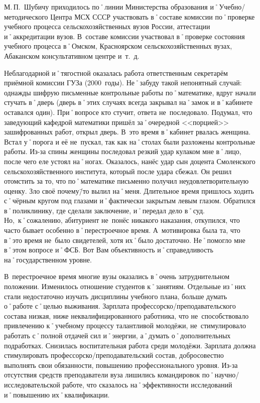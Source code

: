 М.\,П.~Шубичу приходилось по˚линии Министерства образования и˚Учебно\-/методического Центра МСХ СССР участвовать в˚составе комиссии по˚проверке учебного процесса сельскохозяйственных вузов России, аттестации и˚аккредитации вузов. В~составе комиссии участвовал в˚проверке состояния учебного процесса в˚Омском, Красноярском сельскохозяйственных вузах, Абаканском консультативном центре и~т.~д.

Неблагодарной и˚тягостной оказалась работа ответственным секретарём приёмной комиссии ГУЗа (2000~годы). Не˚забуду такой непонятный случай: однажды шифрую письменные контрольные работы по˚математике, вдруг начали стучать в˚дверь (дверь в˚этих случаях всегда закрывал на˚замок и в˚кабинете оставался один). При˚вопросе кто стучит, ответа не~последовало. Подумал, что заведующий кафедрой математики пришёл за˚очередной <<порцией>> зашифрованных работ, открыл дверь. В~это время в˚кабинет рвалась женщина. Встал у˚порога и её не~пускал, так как на˚столах были разложены контрольные работы. Из-за спины женщины последовал резкий удар кулаком мне в˚лицо, после чего еле устоял на˚ногах. Оказалось, нанёс удар сын доцента Смоленского сельскохозяйственного института, который после удара сбежал. Он решил отомстить за то, что по˚математике письменно получил неудовлетворительную оценку. Зло своё почему\=/то вылил на˚меня. Длительное время пришлось ходить с˚чёрным кругом под глазами и˚фактически закрытым левым глазом. Обратился в˚поликлинику, где сделали заключение, и˚передал дело в˚суд. Но,~к˚сожалению, абитуриент не~понёс никакого наказания, откупился, что часто бывает особенно в˚перестроечное время. А~мотивировка была та, что в˚это время не~было свидетелей, хотя их˚было достаточно. Не˚помогло мне в˚этом вопросе и˚ФСБ. Вот Вам объективность и˚справедливость на˚государственном уровне.

В~перестроечное время многие вузы оказались в˚очень затруднительном положении. Изменилось отношение студентов к˚занятиям. Отдельные из˚них стали недостаточно изучать дисциплины учебного плана, больше думать о˚работе с˚целью выживания. Зарплата профессорско\-/преподавательского состава низкая, ниже неквалифицированного работника, что не~способствовало привлечению к˚учебному процессу талантливой молодёжи, не~стимулировало работать с˚полной отдачей сил и˚энергии, а˚думать о˚дополнительных подработках. Снизилась воспитательная работа среди молодёжи. Зарплата должна стимулировать профессорско\-/преподавательский состав, добросовестно выполнять свои обязанности, повышению профессионального уровня. Из-за отсутствия средств преподаватели вуза лишились командировок по˚научно\-/исследовательской работе, что сказалось на˚эффективности исследований и˚повышению их˚квалификации. 

